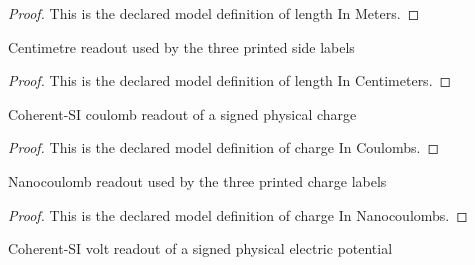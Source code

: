 \begin{proof}
  This is the declared model definition of length In Meters.
\end{proof}
\begin{definition}
  \label{def:physics:phyx-mini-0859:phyxminiproblems-problemphyxmini0859-lengthincentimeters}
  Centimetre readout used by the three printed side labels
\end{definition}
\begin{proof}
  This is the declared model definition of length In Centimeters.
\end{proof}
\begin{definition}
  \label{def:physics:phyx-mini-0859:phyxminiproblems-problemphyxmini0859-chargeincoulombs}
  Coherent-SI coulomb readout of a signed physical charge
\end{definition}
\begin{proof}
  This is the declared model definition of charge In Coulombs.
\end{proof}
\begin{definition}
  \label{def:physics:phyx-mini-0859:phyxminiproblems-problemphyxmini0859-chargeinnanocoulombs}
  Nanocoulomb readout used by the three printed charge labels
\end{definition}
\begin{proof}
  This is the declared model definition of charge In Nanocoulombs.
\end{proof}
\begin{definition}
  \label{def:physics:phyx-mini-0859:phyxminiproblems-problemphyxmini0859-electricpotentialinvolts}
  Coherent-SI volt readout of a signed physical electric potential
\end{definition}
